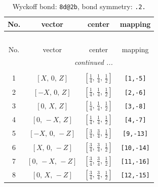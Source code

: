\documentclass[fleqn,8pt]{jsarticle}
\begin{document}
\begin{longtable}{cccc}
\caption{Wyckoff bond: {\tt 8d@2b}, bond symmetry: {\tt .2.}}
 \\
 \hline \hline
No. & vector & center & mapping \\ \hline \endfirsthead

\multicolumn{3}{l}{\tablename\ \thetable{}} \\
 \hline \hline
No. & vector & center & mapping \\ \hline \endhead

 \hline \hline
\multicolumn{3}{r}{\footnotesize\it continued ...} \\ \endfoot

 \hline \hline
\multicolumn{3}{r}{} \\ \endlastfoot

1 & $\left[ X,\, 0,\, Z \right]$ & $\left[ \frac{1}{4},\, \frac{1}{4},\, \frac{1}{2} \right]$ & {\tt [1,-5]} \\ \hline
2 & $\left[ - X,\, 0,\, Z \right]$ & $\left[ \frac{1}{4},\, \frac{1}{4},\, \frac{1}{2} \right]$ & {\tt [2,-6]} \\ \hline
3 & $\left[ 0,\, X,\, Z \right]$ & $\left[ \frac{1}{4},\, \frac{1}{4},\, \frac{1}{2} \right]$ & {\tt [3,-8]} \\ \hline
4 & $\left[ 0,\, - X,\, Z \right]$ & $\left[ \frac{1}{4},\, \frac{1}{4},\, \frac{1}{2} \right]$ & {\tt [4,-7]} \\ \hline
5 & $\left[ - X,\, 0,\, - Z \right]$ & $\left[ \frac{3}{4},\, \frac{3}{4},\, \frac{1}{2} \right]$ & {\tt [9,-13]} \\ \hline
6 & $\left[ X,\, 0,\, - Z \right]$ & $\left[ \frac{3}{4},\, \frac{3}{4},\, \frac{1}{2} \right]$ & {\tt [10,-14]} \\ \hline
7 & $\left[ 0,\, - X,\, - Z \right]$ & $\left[ \frac{3}{4},\, \frac{3}{4},\, \frac{1}{2} \right]$ & {\tt [11,-16]} \\ \hline
8 & $\left[ 0,\, X,\, - Z \right]$ & $\left[ \frac{3}{4},\, \frac{3}{4},\, \frac{1}{2} \right]$ & {\tt [12,-15]} \\
\end{longtable}
\renewcommand{\arraystretch}{1.2}
\end{document}
